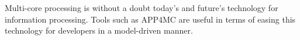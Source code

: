 Multi-core processing is without a doubt today's and future's technology for information processing. Tools such as APP4MC are useful in terms of easing this technology for developers in a model-driven manner. 



